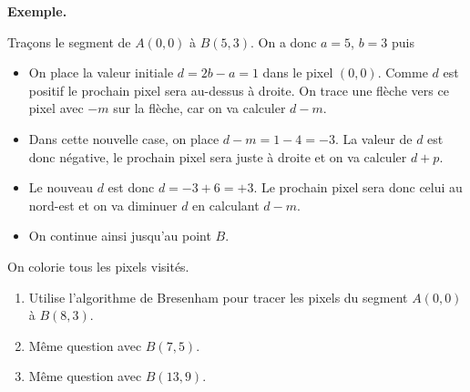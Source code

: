 \documentclass[class=report,crop=false, 12pt]{standalone}
\begin{document}
\begin{activite}



\bigskip

\textbf{Exemple.} 


Traçons le segment de $A(0,0)$ à $B(5,3)$.
On a donc $a=5$, $b=3$ puis

\begin{itemize}
  \item On place la valeur initiale $d=2b-a=1$ dans le pixel $(0,0)$. Comme $d$ est positif le prochain pixel sera au-dessus à droite. On trace une flèche vers ce pixel avec $-m$ sur la flèche, car on va calculer $d-m$.
 
 \smallskip
 
  
  \item Dans cette nouvelle case, on place $d-m=1-4=-3$. La valeur de $d$ est donc négative, le prochain pixel sera juste à droite et on va calculer $d+p$. 
  
 \smallskip
  

  \item Le nouveau $d$ est donc $d=-3+6 = +3$. Le prochain pixel sera donc celui au nord-est et on va diminuer $d$ en calculant $d-m$.
   
 \smallskip
 

  \item On continue ainsi jusqu'au point $B$.
   
 \smallskip
 
 
\end{itemize}

On colorie tous les pixels visités. 




\begin{enumerate}
   \item Utilise l'algorithme de Bresenham pour tracer les pixels du segment $A(0,0)$ à $B(8,3)$.
   
   
   \item Même question avec $B(7,5)$.
   
  
   \item Même question avec $B(13,9)$.
   
       
   
\end{enumerate}

\end{activite}
\end{document}
